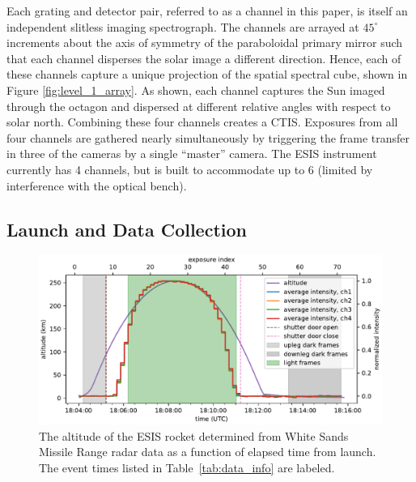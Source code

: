     	Each grating and detector pair, referred to as a channel in this paper,
    	is itself an independent slitless imaging spectrograph.  
    	The channels are arrayed at $45^{\circ}$ increments about the axis of symmetry of the paraboloidal primary mirror such that each channel disperses the solar image a different direction. 
    	Hence, each of these channels capture a unique projection of the spatial spectral cube, shown in Figure \ref{fig:level_1_array}. 
    	As shown, each channel captures the Sun imaged through the octagon and dispersed at different relative angles with respect to solar north. Combining these four channels creates a CTIS. 
    	Exposures from all four channels are gathered nearly simultaneously by triggering the frame transfer in three of the cameras by a single ``master'' camera. 
    	The ESIS instrument currently has 4 channels, but is built to accommodate up to 6 (limited by interference with the optical bench).

    
	\subsection{Launch and Data Collection} 
		\begin{figure}[ht]
			\begin{center}
				\includegraphics{figures/signal_and_altitude_vs_time}
				\caption{The altitude of the ESIS rocket determined from White Sands Missile Range radar data as a function of elapsed time from launch.  The event times listed in Table~\ref{tab:data_info} are labeled.}
				\label{fig:timeline}
			\end{center}
		\end{figure}

